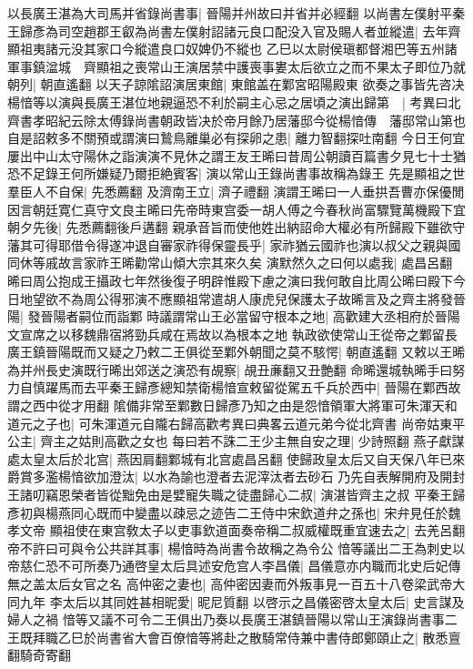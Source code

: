 以長廣王湛為大司馬并省錄尚書事|{
	晉陽并州故曰并省并必經翻}
以尚書左僕射平秦王歸彥為司空趙郡王叡為尚書左僕射詔諸元良口配没入官及賜人者並縱遣|{
	去年齊顯祖夷諸元没其家口今縱遣良口奴婢仍不縱也}
乙巳以太尉侯瑱都督湘巴等五州諸軍事鎮湓城　齊顯祖之喪常山王演居禁中護喪事婁太后欲立之而不果太子即位乃就朝列|{
	朝直遙翻}
以天子諒隂詔演居東館|{
	東館盖在鄴宮昭陽殿東}
欲奏之事皆先咨决楊愔等以演與長廣王湛位地親逼恐不利於嗣主心忌之居頃之演出歸第　|{
	考異曰北齊書孝昭紀云除太傅錄尚書朝政皆决於帝月餘乃居藩邸今從楊愔傳　藩邸常山第也}
自是詔敕多不關預或謂演曰鷙鳥離巢必有探卵之患|{
	離力智翻探吐南翻}
今日王何宜屢出中山太守陽休之詣演演不見休之謂王友王晞曰昔周公朝讀百篇書夕見七十士猶恐不足錄王何所嫌疑乃爾拒絶賓客|{
	演以常山王錄尚書事故稱為錄王}
先是顯祖之世羣臣人不自保|{
	先悉薦翻}
及濟南王立|{
	濟子禮翻}
演謂王晞曰一人垂拱吾曹亦保優閒因言朝廷寛仁真守文良主晞曰先帝時東宫委一胡人傅之今春秋尚富驟覽萬機殿下宜朝夕先後|{
	先悉薦翻後戶遘翻}
親承音旨而使他姓出納詔命大權必有所歸殿下雖欲守藩其可得耶借令得遂冲退自審家祚得保靈長乎|{
	家祚猶云國祚也演以叔父之親與國同休等戚故言家祚王晞勸常山傾大宗其來久矣}
演默然久之曰何以處我|{
	處昌呂翻}
晞曰周公抱成王攝政七年然後復子明辟惟殿下慮之演曰我何敢自比周公晞曰殿下今日地望欲不為周公得邪演不應顯祖常遣胡人康虎兒保護太子故晞言及之齊主將發晉陽|{
	發晉陽者嗣位而詣鄴}
時議謂常山王必當留守根本之地|{
	高歡建大丞相府於晉陽文宣席之以移魏鼎宿將勁兵咸在焉故以為根本之地}
執政欲使常山王從帝之鄴留長廣王鎮晉陽既而又疑之乃敕二王俱從至鄴外朝聞之莫不駭愕|{
	朝直遙翻}
又敕以王晞為并州長史演既行晞出郊送之演恐有覘察|{
	覘丑亷翻又丑艶翻}
命晞還城執晞手曰努力自慎躍馬而去平秦王歸彥總知禁衛楊愔宣敕留從駕五千兵於西中|{
	晉陽在鄴西故謂之西中從才用翻}
隂備非常至鄴數日歸彥乃知之由是怨愔領軍大將軍可朱渾天和道元之子也|{
	可朱渾道元自隴右歸高歡考異曰典畧云道元弟今從北齊書}
尚帝姑東平公主|{
	齊主之姑則高歡之女也}
每曰若不誅二王少主無自安之理|{
	少詩照翻}
燕子獻謀處太皇太后於北宫|{
	燕因肩翻鄴城有北宫處昌呂翻}
使歸政皇太后又自天保八年已來爵賞多濫楊愔欲加澄汰|{
	以水為諭也澄者去泥滓汰者去砂石}
乃先自表解開府及開封王諸叨竊恩榮者皆從黜免由是嬖寵失職之徒盡歸心二叔|{
	演湛皆齊主之叔}
平秦王歸彥初與楊燕同心既而中變盡以疎忌之迹告二王侍中宋欽道弁之孫也|{
	宋弁見任於魏孝文帝}
顯祖使在東宫敎太子以吏事欽道面奏帝稱二叔威權既重宜速去之|{
	去羌呂翻}
帝不許曰可與令公共詳其事|{
	楊愔時為尚書令故稱之為令公}
愔等議出二王為刺史以帝慈仁恐不可所奏乃通啓皇太后具述安危宫人李昌儀|{
	昌儀意亦内職而北史后妃傳無之盖太后女官之名}
高仲密之妻也|{
	高仲密因妻而外叛事見一百五十八卷梁武帝大同九年}
李太后以其同姓甚相昵愛|{
	昵尼質翻}
以啓示之昌儀密啓太皇太后|{
	史言謀及婦人之禍}
愔等又議不可令二王俱出乃奏以長廣王湛鎮晉陽以常山王演錄尚書事二王既拜職乙巳於尚書省大會百僚愔等將赴之散騎常侍兼中書侍郎鄭頤止之|{
	散悉亶翻騎奇寄翻}
